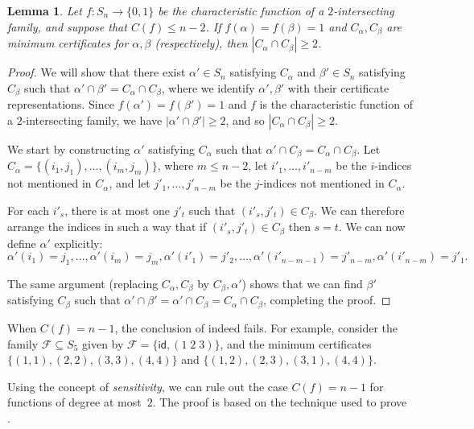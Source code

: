 \documentclass[10pt,a4paper]{amsart}
\newtheorem{lemma}[theorem]{Lemma}
\theoremstyle{definition}
\providecommand{\id}{\mathsf{id}}
\begin{document}
\begin{lemma} \label{lem:2-int-coset-sym}
Let $f\colon S_n \to \{0,1\}$ be the characteristic function of a $2$-intersecting family, and suppose that $C(f) \leq n-2$. If $f(\alpha) = f(\beta) = 1$ and $C_\alpha,C_\beta$ are minimum certificates for $\alpha,\beta$ (respectively), then $|C_\alpha \cap C_\beta| \geq 2$.
\end{lemma}
\begin{proof}
We will show that there exist $\alpha' \in S_n$ satisfying $C_\alpha$ and $\beta' \in S_n$ satisfying $C_\beta$ such that $\alpha' \cap \beta' = C_\alpha \cap C_\beta$, where we identify $\alpha',\beta'$ with their certificate representations. Since $f(\alpha') = f(\beta') = 1$ and $f$ is the characteristic function of a $2$-intersecting family, we have $|\alpha' \cap \beta'| \geq 2$, and so $|C_\alpha \cap C_\beta| \geq 2$.

We start by constructing $\alpha'$ satisfying $C_\alpha$ such that $\alpha' \cap C_\beta = C_\alpha \cap C_\beta$. Let $C_\alpha = \{(i_1,j_1),\ldots,(i_m,j_m)\}$, where $m \leq n-2$, let $i'_1,\ldots,i'_{n-m}$ be the $i$-indices not mentioned in $C_\alpha$, and let $j'_1,\ldots,j'_{n-m}$ be the $j$-indices not mentioned in $C_\alpha$.

For each $i'_s$, there is at most one $j'_t$ such that $(i'_s,j'_t) \in C_\beta$. We can therefore arrange the indices in such a way that if $(i'_s,j'_t) \in C_\beta$ then $s = t$. We can now define $\alpha'$ explicitly:
\[
 \alpha'(i_1) = j_1, \ldots, \alpha'(i_m) = j_m,
 \alpha'(i'_1) = j'_2, \ldots, \alpha'(i'_{n-m-1}) = j'_{n-m}, \alpha'(i'_{n-m}) = j'_1.
\]

The same argument (replacing $C_\alpha,C_\beta$ by $C_\beta,\alpha'$) shows that we can find $\beta'$ satisfying $C_\beta$ such that $\alpha' \cap \beta' = \alpha' \cap C_\beta = C_\alpha \cap C_\beta$, completing the proof.
\end{proof}

When $C(f) = n-1$, the conclusion of  indeed fails. For example, consider the family $\mathcal{F} \subseteq S_5$ given by $\mathcal{F} = \{ \id, (1\;2\;3) \}$, and the minimum certificates $\{(1,1),(2,2),(3,3),(4,4)\}$ and $\{(1,2),(2,3),(3,1),(4,4)\}$.

\smallskip

Using the concept of \emph{sensitivity}, we can rule out the case $C(f) = n-1$ for functions of degree at most~$2$. The proof is based on the technique used to prove \cite[Lemma 3.6]{DFLLV}.
\end{document}
